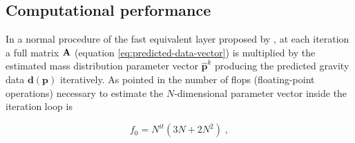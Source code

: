 \documentclass[manuscript,revised]{geophysics}
\begin{document}










\subsection{Computational performance}
In a normal procedure of the fast equivalent layer proposed by \citet{siqueira-etal2017}, at each iteration a full matrix $\tensor{A}$ (equation \ref{eq:predicted-data-vector}) is multiplied by the estimated mass distribution parameter vector $\hat{\mathbf{p}}^k$ producing the predicted gravity data $\mathbf{d(p)}$  iteratively. As pointed in \citet{siqueira-etal2017} the number of flops (floating-point operations) necessary to estimate the $N$-dimensional parameter vector inside the iteration loop is

\begin{equation}
f_0 = N^{it} (3N + 2N^2) \; ,
\label{eq:float_classic}
\end{equation}
\end{document}
